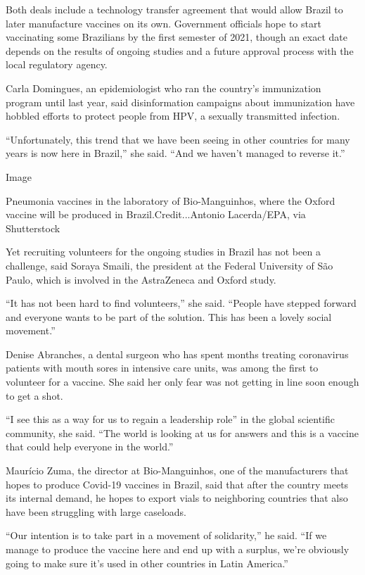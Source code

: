 Both deals include a technology transfer agreement that would allow
Brazil to later manufacture vaccines on its own. Government officials
hope to start vaccinating some Brazilians by the first semester of 2021,
though an exact date depends on the results of ongoing studies and a
future approval process with the local regulatory agency.

Carla Domingues, an epidemiologist who ran the country's immunization
program until last year, said disinformation campaigns about
immunization have hobbled efforts to protect people from HPV, a sexually
transmitted infection.

``Unfortunately, this trend that we have been seeing in other countries
for many years is now here in Brazil,'' she said. ``And we haven't
managed to reverse it.''

Image

Pneumonia vaccines in the laboratory of Bio-Manguinhos, where the Oxford
vaccine will be produced in Brazil.Credit...Antonio Lacerda/EPA, via
Shutterstock

Yet recruiting volunteers for the ongoing studies in Brazil has not been
a challenge, said Soraya Smaili, the president at the Federal University
of São Paulo, which is involved in the AstraZeneca and Oxford study.

``It has not been hard to find volunteers,'' she said. ``People have
stepped forward and everyone wants to be part of the solution. This has
been a lovely social movement.''

Denise Abranches, a dental surgeon who has spent months treating
coronavirus patients with mouth sores in intensive care units, was among
the first to volunteer for a vaccine. She said her only fear was not
getting in line soon enough to get a shot.

``I see this as a way for us to regain a leadership role'' in the global
scientific community, she said. ``The world is looking at us for answers
and this is a vaccine that could help everyone in the world.''

Maurício Zuma, the director at Bio-Manguinhos, one of the manufacturers
that hopes to produce Covid-19 vaccines in Brazil, said that after the
country meets its internal demand, he hopes to export vials to
neighboring countries that also have been struggling with large
caseloads.

``Our intention is to take part in a movement of solidarity,'' he said.
``If we manage to produce the vaccine here and end up with a surplus,
we're obviously going to make sure it's used in other countries in Latin
America.''

